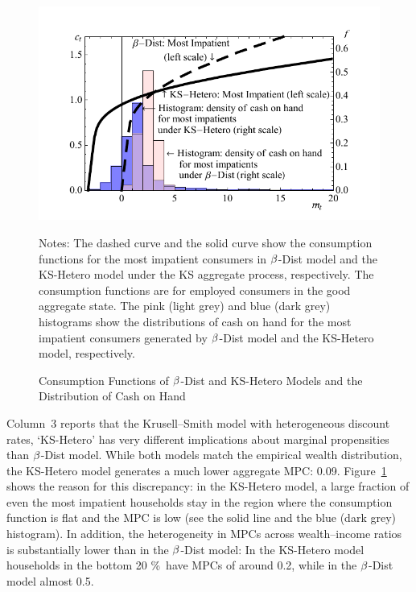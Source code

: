 \documentclass[12pt,titlepage]{econtex}
\newcommand{\jbemph}[1]{{\textbf{\color{jirkasblue}#1}}}
\begin{document}
\begin{figure}
  \caption{Consumption Functions of  $\beta$-Dist and KS-Hetero Models and the Distribution of Cash on Hand}
  \label{CFuncKSHeteroAndDistSevenAndHistDataKSHeteroPlot}
  \begin{center}
    \includegraphics{./Figures/CFuncKSHeteroAndDistSevenAndHistDataKSHeteroPlot}
  \end{center}
    {\footnotesize Notes: The dashed curve and the solid curve show the consumption functions for the most impatient consumers in $\beta$-Dist model and the KS-Hetero model under the KS aggregate process, respectively. The consumption functions are for employed consumers in the good aggregate state. The pink (light grey) and blue (dark grey) histograms show the distributions of cash on hand for the most impatient consumers generated by $\beta$-Dist model and the KS-Hetero model, respectively.}
\end{figure}

Column~3 reports that the Krusell--Smith model with heterogeneous discount rates, `KS-Hetero' has very different implications about marginal propensities than $\beta$-Dist model.  While both models match the empirical wealth distribution, the KS-Hetero model generates a much lower aggregate MPC: 0.09. Figure~\ref{CFuncKSHeteroAndDistSevenAndHistDataKSHeteroPlot} shows the reason for this discrepancy: in the KS-Hetero model, a large fraction of even the most impatient households stay in the region where the consumption function is flat and the MPC is low (see the solid line and the blue (dark grey) histogram). In addition, the heterogeneity in MPCs across wealth--income ratios is substantially lower than in the $\beta$-Dist model: In the KS-Hetero model households in the bottom 20 \%\ have MPCs of around 0.2, while in the $\beta$-Dist model almost 0.5.
\end{document}
